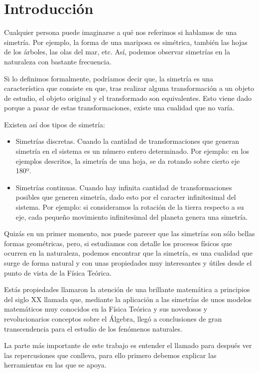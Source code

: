 \section{Introducción}\label{sec:introduccion}

Cualquier persona puede imaginarse a qué nos referimos si hablamos de una simetría. Por ejemplo, la forma de una mariposa es simétrica, también las hojas de los árboles, las olas del mar, etc. Así, podemos observar simetrías en la naturaleza con bastante frecuencia.

Si lo definimos formalmente, podríamos decir que, la simetría es una característica que consiste en que, tras realizar alguna transformación a un objeto de estudio, el objeto original y el transformado son equivalentes. Esto viene dado porque a pasar de estas transformaciones, existe una cualidad que no varía.

Existen así dos tipos de simetría:
\begin{itemize}
    \item Simetrías discretas. Cuando la cantidad de transformaciones que generan simetría en el sistema es un número entero determinado. Por ejemplo: en los ejemplos descritos, la simetría de una hoja, se da rotando sobre cierto eje 180º.
    \item Simetrías continuas. Cuando hay infinita cantidad de transformaciones posibles que generen simetría, dado esto por el caracter infinitesimal del sistema. Por ejemplo: si consideramos la rotación de la tierra respecto a su eje, cada pequeño movimiento infinitesimal del planeta genera una simetría.
\end{itemize}

Quizás en un primer momento, nos puede parecer que las simetrías son sólo bellas formas geométricas, pero, si estudiamos con detalle los procesos físicos que ocurren en la naturaleza, podemos encontrar que la simetría, es una cualidad que surge de forma natural y con unas propiedades muy interesantes y útiles desde el punto de vista de la Física Teórica.

Estás propiedades llamaron la atención de una brillante matemática a principios del siglo XX llamada  que, mediante la aplicación a las simetrías de unos modelos matemáticos muy conocidos en la Física Teórica y sus novedosos y revolucionarios conceptos sobre el Álgebra, llegó a conclusiones de gran transcendencia para el estudio de los fenómenos naturales.

La parte más importante de este trabajo es entender el llamado  para después ver las repercusiones que conlleva, para ello primero debemos explicar las herramientas en las que se apoya.